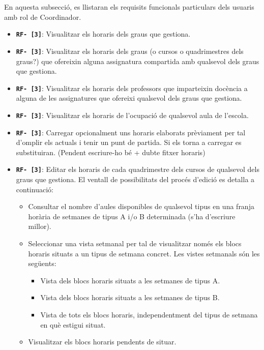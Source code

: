 \documentclass[a4paper,12pt]{ThesisStyle}
\begin{document}
En aquesta subsecció, es llistaran els requisits funcionals particulars dels usuaris amb rol de Coordinador.

\begin{itemize}
  \item \texttt{\textbf{RF- [3]}}: Visualitzar els horaris dels graus que gestiona.
  \item \texttt{\textbf{RF- [3]}}: Visualitzar els horaris dels graus (o cursos o quadrimestres dels graus?) que ofereixin alguna assignatura compartida amb qualsevol dels graus que gestiona.
  \item \texttt{\textbf{RF- [3]}}: Visualitzar els horaris dels professors que imparteixin docència a alguna de les assignatures que ofereixi qualsevol dels graus que gestiona.
  \item \texttt{\textbf{RF- [3]}}: Visualitzar els horaris de l'ocupació de qualsevol aula de l'escola.
  \item \texttt{\textbf{RF- [3]}}: Carregar opcionalment uns horaris elaborats prèviament per tal d'omplir els actuals i tenir un punt de partida. Si els torna a carregar es substituiran. (Pendent escriure-ho bé + dubte fitxer horaris)
  \item \texttt{\textbf{RF- [3]}}: Editar els horaris de cada quadrimestre dels cursos de qualsevol dels graus que gestiona. El ventall de possibilitats del procés d'edició es detalla a continuació:
    \begin{itemize}
      \item Consultar el nombre d'aules disponibles de qualsevol tipus en una franja horària de setmanes de tipus A i/o B determinada (s'ha d'escriure millor).
      \item Seleccionar una vista setmanal per tal de visualitzar només els blocs horaris situats a un tipus de setmana concret. Les vistes setmanals són les següents:
        \begin{itemize}
          \item Vista dels blocs horaris situats a les setmanes de tipus A.
          \item Vista dels blocs horaris situats a les setmanes de tipus B.
          \item Vista de tots els blocs horaris, independentment del tipus de setmana en què estigui situat.
        \end{itemize}
      \item Visualitzar els blocs horaris pendents de situar.
      

\end{itemize}
\end{itemize}
\end{document}

